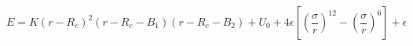 \documentclass[12pt]{article}
\begin{document}
$$ 
  E = K (r - R_c)^ 2 (r - R_c - B_1) (r - R_c - B_2) + U_0 +
  4 \epsilon \left[ \left(\frac{\sigma}{r}\right)^{12} - 
    \left(\frac{\sigma}{r}\right)^6 \right] + \epsilon
$$
\end{document}
